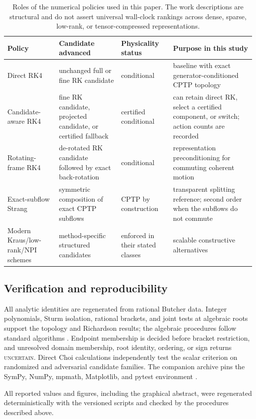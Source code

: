 \begin{table}[t]
\centering
\caption{Roles of the numerical policies used in this paper. The work descriptions are structural and do not assert universal wall-clock rankings across dense, sparse, low-rank, or tensor-compressed representations.}
\label{tab:method_comparison}
\small
\begin{tabularx}{\textwidth}{@{}p{}p{}p{}X@{}}
\toprule
Policy & Candidate advanced & Physicality status & Purpose in this study \\
\midrule
Direct RK4 & unchanged full or fine RK candidate & conditional & baseline with exact generator-conditioned CPTP topology \\
Candidate-aware RK4 & fine RK candidate, projected candidate, or certified fallback & certified conditional & can retain direct RK, select a certified component, or switch; action counts are recorded \\
Rotating-frame RK4 & de-rotated RK candidate followed by exact back-rotation & conditional & representation preconditioning for commuting coherent motion \\
Exact-subflow Strang & symmetric composition of exact CPTP subflows & CPTP by construction & transparent splitting reference; second order when the subflows do not commute \\
Modern Kraus/low-rank/NPI schemes & method-specific structured candidates & enforced in their stated classes & scalable constructive alternatives \cite{CaoLu2025,AppeloCheng2025,HuAppeloCheng2025NPI} \\
\bottomrule
\end{tabularx}
\end{table}

\subsection{Verification and reproducibility}
\label{subsec:verification}

All analytic identities are regenerated from rational Butcher data. Integer polynomials, Sturm isolation, rational brackets, and joint tests at algebraic roots support the topology and Richardson results; the algebraic procedures follow standard algorithms \cite{BasuPollackRoy2006}. Endpoint membership is decided before bracket restriction, and unresolved domain membership, root identity, ordering, or sign returns \textsc{uncertain}. Direct Choi calculations independently test the scalar criterion on randomized and adversarial candidate families. The companion archive pins the SymPy, NumPy, mpmath, Matplotlib, and pytest environment \cite{MeurerEtAl2017,HarrisEtAl2020,JohanssonMpmath,Hunter2007,Pytest2025}.

All reported values and figures, including the graphical abstract, were regenerated deterministically with the versioned scripts and checked by the procedures described above.
